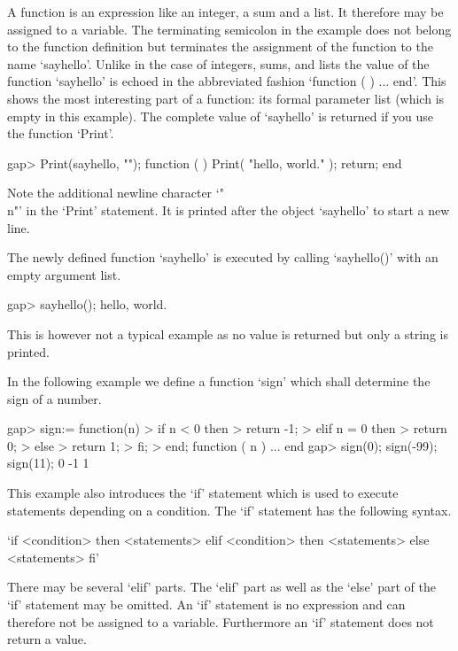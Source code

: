 A {\GAP} function is an expression like an integer, a sum and a list.  It
therefore  may be assigned to a  variable.   The terminating semicolon in
the example does not belong to the function definition but terminates the
assignment of the function to the name `sayhello'.  Unlike in the case of
integers, sums, and lists the value  of the function `sayhello' is echoed
in the abbreviated fashion `function ( )  ...  end'.  This shows the most
interesting part of a function: its formal parameter list (which is empty
in this example).  The  complete value of `sayhello'  is returned if  you
use the function `Print'.

\beginexample
    gap> Print(sayhello, "\n");
    function (  )
        Print( "hello, world.\n" );
        return;
    end
\endexample

Note the  additional newline character  `"\\n"' in the `Print' statement.
It is printed after the object `sayhello' to start a new line.

The newly defined function `sayhello' is executed by calling `sayhello()'
with an empty argument list.

\beginexample
    gap> sayhello();
    hello, world.
\endexample

This is however not a typical example as no  value is returned but only a
string is printed.


In the following example we define a function `sign' which shall determine 
the sign of a number.

\beginexample
    gap> sign:= function(n)
    >        if n < 0 then
    >           return -1;
    >        elif n = 0 then
    >           return 0;
    >        else
    >           return 1;
    >        fi;
    >    end;
    function ( n ) ... end
    gap> sign(0); sign(-99); sign(11);
    0
    -1
    1
\endexample

This example also introduces the `if' statement which is  used to execute
statements  depending  on  a  condition.   The  `if'  statement  has  the
following syntax.

\fmark`if <condition> then
    <statements>
elif <condition> then
    <statements>
else
    <statements>
fi'

There may be several `elif' parts.  The `elif' part as well as the `else'
part  of the  `if' statement may be omitted.   An  `if'  statement  is no
expression and  can therefore not be assigned to a variable.  Furthermore
an `if' statement does not return a value.

